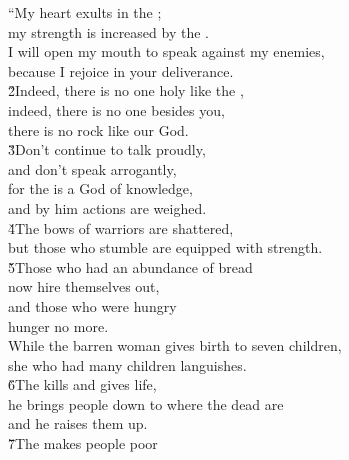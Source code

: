 \begin{poetry}
\poeml ``My heart exults in the ; \\
\poemll    my strength is increased by the . \\
\poeml I will open my mouth to speak against my enemies, \\
\poemll    because I rejoice in your deliverance. \\
\poeml \v{2}Indeed, there is no one holy like the , \\
\poemll    indeed, there is no one besides you, \\
\poeml there is no rock like our God. \\
\poeml \v{3}Don't continue to talk proudly, \\
\poemll    and don't speak arrogantly, \\
\poeml for the  is a God of knowledge, \\
\poemll    and by him actions are weighed. \\
\poeml \v{4}The bows of warriors are shattered, \\
\poemll    but those who stumble are equipped with strength. \\
\poeml \v{5}Those who had an abundance of bread \\
\poemll    now hire themselves out, \\
\poeml and those who were hungry \\
\poemll    hunger no more. \\
\poeml While the barren woman gives birth to seven children, \\
\poemll    she who had many children languishes. \\
\poeml \v{6}The  kills and gives life, \\
\poemll    he brings people down to where the dead are \\
\poemlll       and he raises them up. \\
\poeml \v{7}The  makes people poor \\

\end{poetry}

